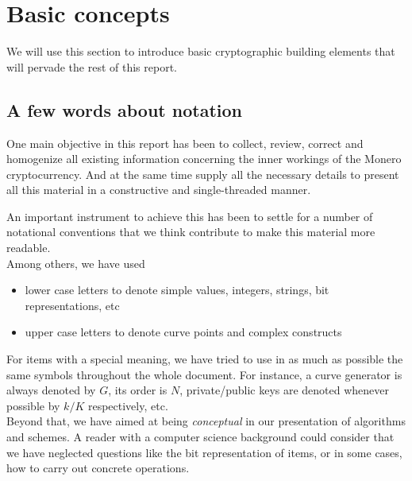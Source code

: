 



\chapter{Basic concepts}
\label{chap:basicConcepts}

We will use this section to introduce basic cryptographic building elements that will pervade the rest of this report.


\section{A few words about notation}

One main objective in this report has been to collect, review, correct and homogenize all existing information
concerning the inner workings of the Monero cryptocurrency.
And at the same time supply all the necessary details to present all this material in a constructive and single-threaded
manner.

An important instrument to achieve this has been to settle for a number of notational conventions that we think
contribute to make this material more readable.
\\

Among others, we have used
\begin{itemize}
\item lower case letters to denote simple values, integers, strings, bit representations, etc
\item upper case letters to denote curve points and complex constructs
\end{itemize}

For items with a special meaning, we have tried to use in as much as possible the same symbols throughout the
whole document. 
For instance,
a curve generator is always denoted by \(G\), its order is \(N\), private/public keys are denoted whenever possible by \(k/K\) 
respectively, etc.
\\

Beyond that, we have aimed at being {\em conceptual} in our presentation of algorithms and schemes.
A reader with a computer science background could consider that we have neglected
 questions like the bit representation of items, or in some cases, how to carry out concrete operations.


